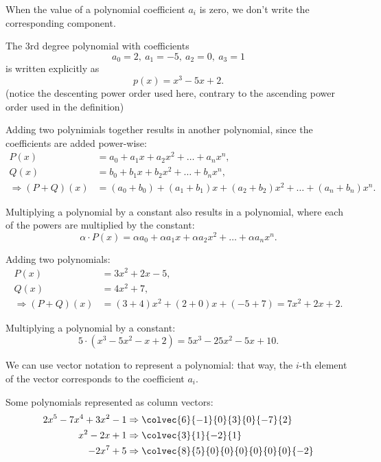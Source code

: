 When the value of a polynomial coefficient $a_{i}$ is zero, we don't write the corresponding component.
\begin{example}
  The 3rd degree polynomial with coefficients
  \begin{equation*}
    a_{0}=2,\ a_{1}=-5,\ a_{2}=0,\ a_{3}=1
  \end{equation*}
  is written explicitly as
  \begin{equation*}
    p(x) = x^{3}-5x+2.
  \end{equation*}
  (notice the descenting power order used here, contrary to the ascending power order used in the definition)
\end{example}

Adding two polynimials together results in another polynomial, since the coefficients are added power-wise:
\begin{align*}
  P(x) &= a_{0} + a_{1}x + a_{2}x^{2} + \dots + a_{n}x^{n},\\
  Q(x) &= b_{0} + b_{1}x + b_{2}x^{2} + \dots + b_{n}x^{n},\\
  \Rightarrow (P+Q)(x) &= (a_{0}+b_{0}) + (a_{1}+b_{1})x + (a_{2}+b_{2})x^{2} + \dots + (a_{n}+b_{n})x^{n}.
\end{align*}

Multiplying a polynomial by a constant also results in a polynomial, where each of the powers are multiplied by the constant:
\begin{equation*}
  \alpha\cdot P(x) = \alpha a_{0} + \alpha a_{1}x + \alpha a_{2}x^{2} + \dots + \alpha a_{n}x^{n}.
\end{equation*}

\begin{example}
  Adding two polynomials:
  \begin{align*}
    P(x) &= 3x^{2} + 2x - 5,\\
    Q(x) &= 4x^{2} + 7,\\
    \Rightarrow(P+Q)(x) &= (3+4)x^{2} + (2+0)x + (-5+7) = 7x^{2} + 2x + 2.
  \end{align*}

  Multiplying a polynomial by a constant:
  \begin{equation*}
    5\cdot\left( x^{3}-5x^{2}-x+2 \right) = 5x^{3} - 25x^{2} - 5x + 10.
  \end{equation*}
\end{example}

We can use vector notation to represent a polynomial: that way, the $i$-th element of the vector corresponds to the coefficient $a_{i}$.
\begin{example}
  Some polynomials represented as column vectors:
  \begin{align*}
    2x^{5} - 7x^{4} + 3x^{2} - 1 &\Rightarrow \colvec{6}{-1}{0}{3}{0}{-7}{2}\\
    x^{2} - 2x + 1 &\Rightarrow \colvec{3}{1}{-2}{1}\\
    -2x^{7}+5 &\Rightarrow \colvec{8}{5}{0}{0}{0}{0}{0}{0}{-2}
  \end{align*}
\end{example}

